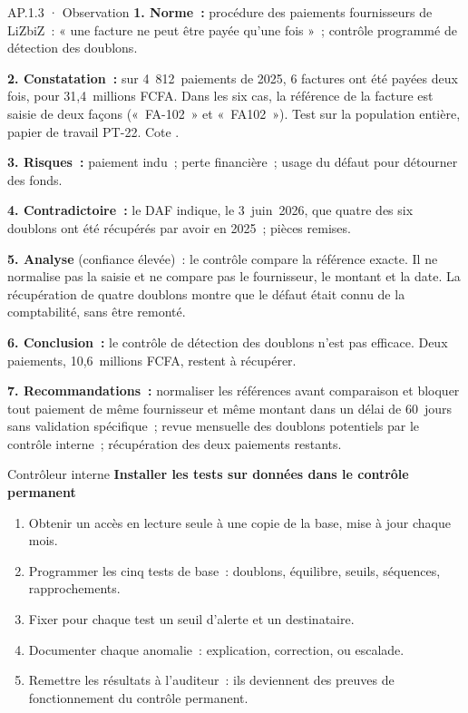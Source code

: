 \begin{boxobjet}{AP.1.3 · Observation}
\textbf{1. Norme~:} procédure des paiements fournisseurs de LiZbiZ~:
« une facture ne peut être payée qu'une fois »~; contrôle programmé de
détection des doublons.

\textbf{2. Constatation~:} sur 4~812~paiements de 2025, 6 factures ont été
payées deux fois, pour 31,4~millions FCFA. Dans les six cas, la référence
de la facture est saisie de deux façons («~FA-102~» et «~FA102~»).
Test sur la population entière, papier de travail PT-22. Cote \NON{}.

\textbf{3. Risques~:} paiement indu~; perte financière~; usage du défaut
pour détourner des fonds.

\textbf{4. Contradictoire~:} le DAF indique, le 3~juin~2026, que quatre des
six doublons ont été récupérés par avoir en 2025~; pièces remises.

\textbf{5. Analyse} (confiance élevée)~: le contrôle compare la référence
exacte. Il ne normalise pas la saisie et ne compare pas le fournisseur, le
montant et la date. La récupération de quatre doublons montre que le
défaut était connu de la comptabilité, sans être remonté.

\textbf{6. Conclusion~:} le contrôle de détection des doublons n'est pas
efficace. Deux paiements, 10,6~millions FCFA, restent à récupérer.

\textbf{7. Recommandations~:} normaliser les références avant comparaison
et bloquer tout paiement de même fournisseur et même montant dans un
délai de 60~jours sans validation spécifique~; revue mensuelle des
doublons potentiels par le contrôle interne~; récupération des deux
paiements restants.
\end{boxobjet}

\begin{boxmetier}{Contrôleur interne}
\textbf{Installer les tests sur données dans le contrôle permanent}
\begin{enumerate}
    \item Obtenir un accès en lecture seule à une copie de la base, mise à
          jour chaque mois.
    \item Programmer les cinq tests de base~: doublons, équilibre, seuils,
          séquences, rapprochements.
    \item Fixer pour chaque test un seuil d'alerte et un destinataire.
    \item Documenter chaque anomalie~: explication, correction, ou
          escalade.
    \item Remettre les résultats à l'auditeur~: ils deviennent des preuves
          de fonctionnement du contrôle permanent.
\end{enumerate}
\end{boxmetier}


